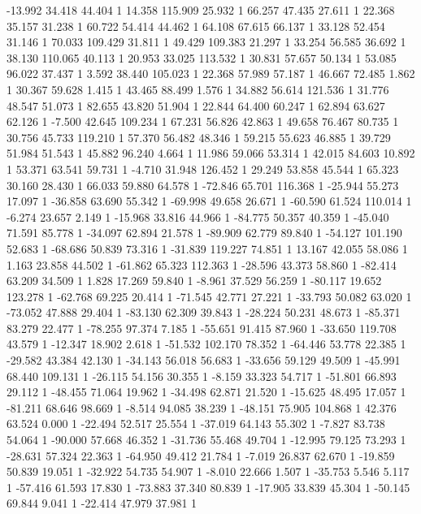 	-13.992 34.418 44.404 1
	14.358 115.909 25.932 1
	66.257 47.435 27.611 1
	22.368 35.157 31.238 1
	60.722 54.414 44.462 1
	64.108 67.615 66.137 1
	33.128 52.454 31.146 1
	70.033 109.429 31.811 1
	49.429 109.383 21.297 1
	33.254 56.585 36.692 1
	38.130 110.065 40.113 1
	20.953 33.025 113.532 1
	30.831 57.657 50.134 1
	53.085 96.022 37.437 1
	3.592 38.440 105.023 1
	22.368 57.989 57.187 1
	46.667 72.485 1.862 1
	30.367 59.628 1.415 1
	43.465 88.499 1.576 1
	34.882 56.614 121.536 1
	31.776 48.547 51.073 1
	82.655 43.820 51.904 1
	22.844 64.400 60.247 1
	62.894 63.627 62.126 1
	-7.500 42.645 109.234 1
	67.231 56.826 42.863 1
	49.658 76.467 80.735 1
	30.756 45.733 119.210 1
	57.370 56.482 48.346 1
	59.215 55.623 46.885 1
	39.729 51.984 51.543 1
	45.882 96.240 4.664 1
	11.986 59.066 53.314 1
	42.015 84.603 10.892 1
	53.371 63.541 59.731 1
	-4.710 31.948 126.452 1
	29.249 53.858 45.544 1
	65.323 30.160 28.430 1
	66.033 59.880 64.578 1
	-72.846 65.701 116.368 1
	-25.944 55.273 17.097 1
	-36.858 63.690 55.342 1
	-69.998 49.658 26.671 1
	-60.590 61.524 110.014 1
	-6.274 23.657 2.149 1
	-15.968 33.816 44.966 1
	-84.775 50.357 40.359 1
	-45.040 71.591 85.778 1
	-34.097 62.894 21.578 1
	-89.909 62.779 89.840 1
	-54.127 101.190 52.683 1
	-68.686 50.839 73.316 1
	-31.839 119.227 74.851 1
	13.167 42.055 58.086 1
	1.163 23.858 44.502 1
	-61.862 65.323 112.363 1
	-28.596 43.373 58.860 1
	-82.414 63.209 34.509 1
	1.828 17.269 59.840 1
	-8.961 37.529 56.259 1
	-80.117 19.652 123.278 1
	-62.768 69.225 20.414 1
	-71.545 42.771 27.221 1
	-33.793 50.082 63.020 1
	-73.052 47.888 29.404 1
	-83.130 62.309 39.843 1
	-28.224 50.231 48.673 1
	-85.371 83.279 22.477 1
	-78.255 97.374 7.185 1
	-55.651 91.415 87.960 1
	-33.650 119.708 43.579 1
	-12.347 18.902 2.618 1
	-51.532 102.170 78.352 1
	-64.446 53.778 22.385 1
	-29.582 43.384 42.130 1
	-34.143 56.018 56.683 1
	-33.656 59.129 49.509 1
	-45.991 68.440 109.131 1
	-26.115 54.156 30.355 1
	-8.159 33.323 54.717 1
	-51.801 66.893 29.112 1
	-48.455 71.064 19.962 1
	-34.498 62.871 21.520 1
	-15.625 48.495 17.057 1
	-81.211 68.646 98.669 1
	-8.514 94.085 38.239 1
	-48.151 75.905 104.868 1
	42.376 63.524 0.000 1
	-22.494 52.517 25.554 1
	-37.019 64.143 55.302 1
	-7.827 83.738 54.064 1
	-90.000 57.668 46.352 1
	-31.736 55.468 49.704 1
	-12.995 79.125 73.293 1
	-28.631 57.324 22.363 1
	-64.950 49.412 21.784 1
	-7.019 26.837 62.670 1
	-19.859 50.839 19.051 1
	-32.922 54.735 54.907 1
	-8.010 22.666 1.507 1
	-35.753 5.546 5.117 1
	-57.416 61.593 17.830 1
	-73.883 37.340 80.839 1
	-17.905 33.839 45.304 1
	-50.145 69.844 9.041 1
	-22.414 47.979 37.981 1
